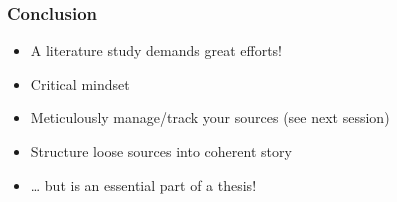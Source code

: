 \documentclass[aspectratio=169]{beamer}
\begin{document}
    \begin{frame}
        \frametitle{Conclusion}
        
        \begin{itemize}
            \item A literature study demands great efforts!
            \item Critical mindset
            \item Meticulously manage/track your sources (see next session)
            \item Structure loose sources into coherent story
            \item \ldots{} but is an essential part of a thesis!
        \end{itemize}
        
    \end{frame}
    
\end{document}
